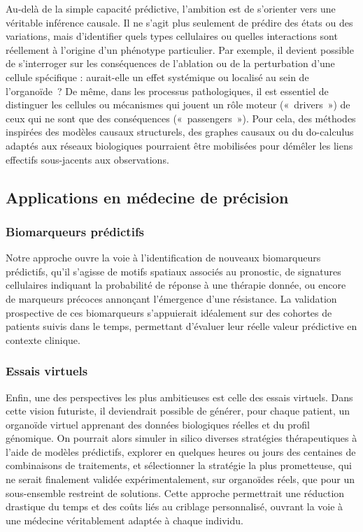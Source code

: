 Au-delà de la simple capacité prédictive, l’ambition est de s’orienter vers une véritable inférence causale. Il ne s’agit plus seulement de prédire des états ou des variations, mais d’identifier quels types cellulaires ou quelles interactions sont réellement à l’origine d’un phénotype particulier. Par exemple, il devient possible de s’interroger sur les conséquences de l’ablation ou de la perturbation d’une cellule spécifique : aurait-elle un effet systémique ou localisé au sein de l’organoïde ? De même, dans les processus pathologiques, il est essentiel de distinguer les cellules ou mécanismes qui jouent un rôle moteur (« drivers ») de ceux qui ne sont que des conséquences (« passengers »). Pour cela, des méthodes inspirées des modèles causaux structurels, des graphes causaux ou du do-calculus adaptés aux réseaux biologiques pourraient être mobilisées pour démêler les liens effectifs sous-jacents aux observations.

\subsection{Applications en médecine de précision}

\subsubsection{Biomarqueurs prédictifs}

Notre approche ouvre la voie à l’identification de nouveaux biomarqueurs prédictifs, qu’il s’agisse de motifs spatiaux associés au pronostic, de signatures cellulaires indiquant la probabilité de réponse à une thérapie donnée, ou encore de marqueurs précoces annonçant l’émergence d’une résistance. La validation prospective de ces biomarqueurs s’appuierait idéalement sur des cohortes de patients suivis dans le temps, permettant d’évaluer leur réelle valeur prédictive en contexte clinique.

\subsubsection{Essais virtuels}

Enfin, une des perspectives les plus ambitieuses est celle des essais virtuels. Dans cette vision futuriste, il deviendrait possible de générer, pour chaque patient, un organoïde virtuel apprenant des données biologiques réelles et du profil génomique. On pourrait alors simuler in silico diverses stratégies thérapeutiques à l’aide de modèles prédictifs, explorer en quelques heures ou jours des centaines de combinaisons de traitements, et sélectionner la stratégie la plus prometteuse, qui ne serait finalement validée expérimentalement, sur organoïdes réels, que pour un sous-ensemble restreint de solutions. Cette approche permettrait une réduction drastique du temps et des coûts liés au criblage personnalisé, ouvrant la voie à une médecine véritablement adaptée à chaque individu.

